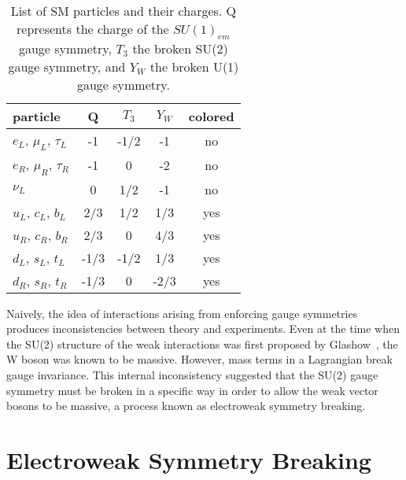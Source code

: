 \begin{table}
\begin{center}
\begin{tabular}{l|c|c|c|c}
\hline 
\hline
particle & Q  & $T_3$ & $Y_W$ & colored \\ \hline \hline
$e_L$, $\mu_L$, $\tau_L$  & -1 & -1/2   &  -1 &  no \\ 
$e_R$, $\mu_R$, $\tau_R$  & -1 & 0      &  -2 &  no \\ 
$\nu_L$  & 0   & 1/2 & -1 & no \\ 
$u_L$, $c_L$, $b_L$    & 2/3 & 1/2  & 1/3& yes \\ 
$u_R$, $c_R$, $b_R$    & 2/3 & 0  & 4/3& yes \\ 
$d_L$, $s_L$, $t_L$    & -1/3& -1/2 & 1/3& yes \\ 
$d_R$, $s_R$, $t_R$    & -1/3& 0 & -2/3& yes \\
\hline
\end{tabular}
\end{center}
\caption{List of SM particles and their charges. 
Q represents the charge of the $SU(1)_{em}$ gauge symmetry,
$T_3$ the broken SU(2) gauge symmetry, and $Y_W$ the broken 
U(1) gauge symmetry.}
\label{table:SMcharges}
\end{table}

Naively, the idea of interactions arising from enforcing gauge
symmetries produces inconsistencies between theory and
experiments.  Even at the time when the SU(2) structure of the
weak interactions was first proposed by
Glashow~\cite{Glashow:1961}, the W boson was known to be massive.  
However, mass terms in a Lagrangian break gauge
invariance.  This internal inconsistency suggested that
the SU(2) gauge symmetry must be broken in a specific way in order
to allow the weak vector bosons to be massive, a process known
as electroweak symmetry breaking.  

\section{Electroweak Symmetry Breaking}
\label{sec:Electroweak Symmetry Breaking}

